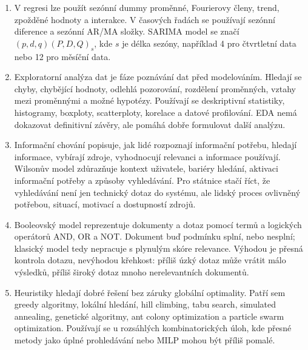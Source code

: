 \documentclass[12pt,a4paper]{article}
\begin{document}
\begin{enumerate}
  \item {}

  V regresi lze použít sezónní dummy proměnné, Fourierovy členy, trend, zpožděné hodnoty a interakce.
  V časových řadách se používají sezónní diference a sezónní AR/MA složky. SARIMA model se značí
  \((p,d,q)(P,D,Q)_s\), kde \(s\) je délka sezóny, například 4 pro čtvrtletní data nebo 12 pro
  měsíční data.

  \item {}

  Exploratorní analýza dat je fáze poznávání dat před modelováním. Hledají se chyby, chybějící
  hodnoty, odlehlá pozorování, rozdělení proměnných, vztahy mezi proměnnými a možné hypotézy.
  Používají se deskriptivní statistiky, histogramy, boxploty, scatterploty, korelace a datové
  profilování. EDA nemá dokazovat definitivní závěry, ale pomáhá dobře formulovat další analýzu.

  \item {}

  Informační chování popisuje, jak lidé rozpoznají informační potřebu, hledají informace, vybírají
  zdroje, vyhodnocují relevanci a informace používají. Wilsonův model zdůrazňuje kontext uživatele,
  bariéry hledání, aktivaci informační potřeby a způsoby vyhledávání. Pro státnice stačí říct, že
  vyhledávání není jen technický dotaz do systému, ale lidský proces ovlivněný potřebou, situací,
  motivací a dostupností zdrojů.

  \item {}

  Booleovský model reprezentuje dokumenty a dotaz pomocí termů a logických operátorů AND, OR a NOT.
  Dokument buď podmínku splní, nebo nesplní; klasický model tedy nepracuje s plynulým skóre relevance.
  Výhodou je přesná kontrola dotazu, nevýhodou křehkost: příliš úzký dotaz může vrátit málo výsledků,
  příliš široký dotaz mnoho nerelevantních dokumentů.

  \item {}

  Heuristiky hledají dobré řešení bez záruky globální optimality. Patří sem greedy algoritmy,
  lokální hledání, hill climbing, tabu search, simulated annealing, genetické algoritmy, ant colony
  optimization a particle swarm optimization. Používají se u rozsáhlých kombinatorických úloh, kde
  přesné metody jako úplné prohledávání nebo MILP mohou být příliš pomalé.


\end{enumerate}
\end{document}
